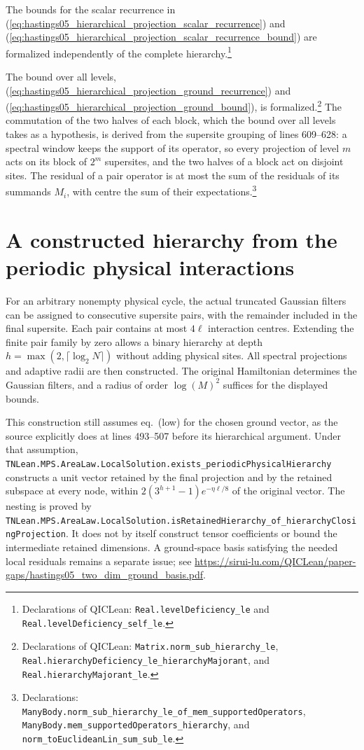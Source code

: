 \documentclass{article}
\providecommand{\leanid}[1]{\nolinkurl{#1}}
\begin{document}
The bounds for the scalar recurrence in (\ref{eq:hastings05_hierarchical_projection_scalar_recurrence}) and
(\ref{eq:hastings05_hierarchical_projection_scalar_recurrence_bound}) are formalized independently of the complete
hierarchy.\footnote{Declarations of QICLean:
    \leanid{Real.levelDeficiency_le} and
    \leanid{Real.levelDeficiency_self_le}.}

The bound over all levels,
(\ref{eq:hastings05_hierarchical_projection_ground_recurrence}) and
(\ref{eq:hastings05_hierarchical_projection_ground_bound}), is
formalized.\footnote{Declarations of QICLean:
    \leanid{Matrix.norm_sub_hierarchy_le},
    \leanid{Real.hierarchyDeficiency_le_hierarchyMajorant}, and
    \leanid{Real.hierarchyMajorant_le}.}
The commutation of the two halves of each block, which the bound over all
levels takes as a hypothesis, is derived from the supersite grouping of lines
609--628: a spectral window keeps the support of its operator, so every
projection of level $m$ acts on its block of $2^m$ supersites, and the two
halves of a block act on disjoint sites. The residual of a pair operator is
at most the sum of the residuals of its summands $M_i$, with centre the sum of
their expectations.\footnote{Declarations:
    \leanid{ManyBody.norm_sub_hierarchy_le_of_mem_supportedOperators},
    \leanid{ManyBody.mem_supportedOperators_hierarchy}, and
    \leanid{norm_toEuclideanLin_sum_sub_le}.}

\section{A constructed hierarchy from the periodic physical interactions}

For an arbitrary nonempty physical cycle, the actual truncated Gaussian
filters can be assigned to consecutive supersite pairs, with the
remainder included in the final supersite. Each pair contains at most
$4\ell$ interaction centres. Extending the finite pair family by zero
allows a binary hierarchy at depth
$h=\max(2,\lceil\log_2N\rceil)$ without adding physical sites.
All spectral projections and adaptive radii are then constructed.
The original Hamiltonian determines the Gaussian filters, and a radius
of order $\log(M)^2$ suffices for the displayed bounds.

This construction still assumes eq.~(low) for the chosen ground vector,
as the source explicitly does at lines 493--507 before its hierarchical
argument. Under that assumption,
\leanid{TNLean.MPS.AreaLaw.LocalSolution.exists_periodicPhysicalHierarchy}
constructs a unit vector retained by the final projection and by the
retained subspace at every node, within
$2(3^{h+1}-1)e^{-\eta\ell/8}$ of the original vector.
The nesting is proved by
\leanid{TNLean.MPS.AreaLaw.LocalSolution.isRetainedHierarchy_of_hierarchyClosingProjection}.
It does not by itself construct tensor coefficients or bound the
intermediate retained dimensions. A ground-space basis satisfying the
needed local residuals remains a separate issue; see
\url{https://sirui-lu.com/QICLean/paper-gaps/hastings05_two_dim_ground_basis.pdf}.



\end{document}
